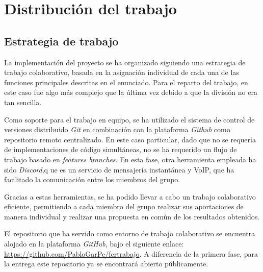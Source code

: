\documentclass[11pt,a4paper]{article}
\begin{document}
\section{Distribución del trabajo}
\subsection{Estrategia de trabajo}
La implementación del proyecto se ha organizado siguiendo una estrategia de trabajo colaborativo, basada en la asignación individual de cada una de las funciones principales descritas en el enunciado. Para el reparto del trabajo, en este caso fue algo más complejo que la última vez debido a que la división no era tan sencilla. \vspace{2ex}

\noindent Como soporte para el trabajo en equipo, se ha utilizado el sistema de control de versiones distribuido \textit{Git} en combinación con la plataforma \textit{Github} como repositorio remoto centralizado. En este caso particular, dado que no se requería de implementaciones de código simultáneas, no se ha requerido un flujo de trabajo basado en \textit{features branches}. En esta fase, otra herramienta empleada ha sido \textit{Discord},q ue es un servicio de mensajería instantánea y VoIP, que ha facilitado la comunicación entre los miembros del grupo. \vspace{2ex}

\noindent Gracias a estas herramientas, se ha podido llevar a cabo un trabajo colaborativo eficiente, permitiendo a cada miembro del grupo realizar sus aportaciones de manera individual y realizar una propuesta en común de los resultados obtenidos.

\noindent El repositorio que ha servido como entorno de trabajo colaborativo se encuentra alojado en la plataforma \textit{GitHub}, bajo el siguiente enlace: \href{https://github.com/PabloGarPe/fcrtrabajo}{https://github.com/PabloGarPe/fcrtrabajo}. A diferencia de la primera fase, para la entrega este repositorio ya se encontrará abierto públicamente.\vspace{3ex}
\end{document}
